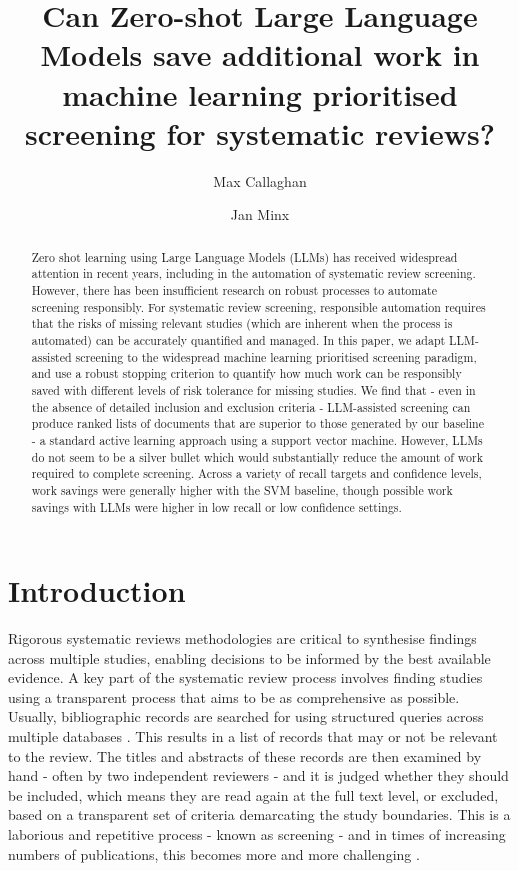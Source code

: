 \documentclass{article}
\title{Can Zero-shot Large Language Models save additional work in machine learning prioritised screening for systematic reviews?}
\author[1,2]{Max Callaghan}
\author[1,2]{Jan Minx}
\affil[1]{Mercator Research Institute on Global Commons and Climate Change, Torgauer Straße 12-15, 10829 Berlin, Germany}
\affil[2]{%
	Potsdam Institute for Climate Impact Research (PIK), Member of the Leibniz Association, P.O. Box 60 12 03, 14412 Potsdam, Germany
}
\begin{document}
	\maketitle
	
	\doublespacing
	
	\begin{abstract}
		Zero shot learning using Large Language Models (LLMs) has received widespread attention in recent years, including in the automation of systematic review screening. 
		However, there has been insufficient research on robust processes to automate screening responsibly. 
		For systematic review screening, responsible automation requires that the risks of missing relevant studies (which are inherent when the process is automated) can be accurately quantified and managed. 
		In this paper, we adapt LLM-assisted screening to the widespread machine learning prioritised screening paradigm, and use a robust stopping criterion to quantify how much work can be responsibly saved with different levels of risk tolerance for missing studies.
		We find that - even in the absence of detailed inclusion and exclusion criteria - LLM-assisted screening can produce ranked lists of documents that are superior to those generated by our baseline - a standard active learning approach using a support vector machine.
		However, LLMs do not seem to be a silver bullet which would substantially reduce the amount of work required to complete screening. Across a variety of recall targets and confidence levels, work savings were generally higher with the SVM baseline, though possible work savings with LLMs were higher in low recall or low confidence settings. 
	\end{abstract}

	\section*{Introduction}
	
	Rigorous systematic reviews methodologies are critical to synthesise findings across multiple studies, enabling decisions to be informed by the best available evidence. 
	A key part of the systematic review process involves finding studies using a transparent process that aims to be as comprehensive as possible. 
	Usually, bibliographic records are searched for using structured queries across multiple databases \cite{lefebvre_chapter_2023}.
	This results in a list of records that may or not be relevant to the review. The titles and abstracts of these records are then examined by hand - often by two independent reviewers - and it is judged whether they should be included, which means they are read again at the full text level, or excluded, based on a transparent set of criteria demarcating the study boundaries.
	This is a laborious and repetitive process - known as screening - and in times of increasing numbers of publications, this becomes more and more challenging \cite{bornmann_growth_2015}. 
	
\end{document}
